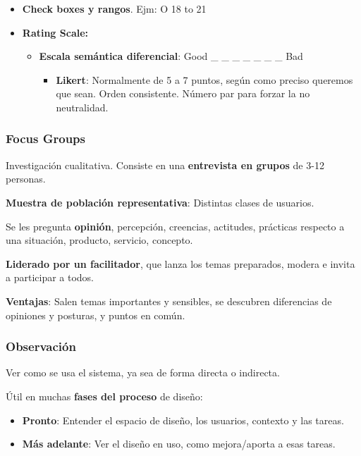 \documentclass[12pt]{report} %
\begin{document}
\begin{itemize}
\item
  \textbf{Check boxes y rangos}. Ejm: O 18 to 21
\item
  \textbf{Rating Scale:}

  \begin{itemize}
  
  \item
    \textbf{Escala semántica diferencial}: Good \_ \_ \_ \_ \_ \_ \_ Bad

    \begin{itemize}
    
    \item
      \textbf{Likert}: Normalmente de 5 a 7 puntos, según como preciso
      queremos que sean. Orden consistente. Número par para forzar la no
      neutralidad.
    \end{itemize}
  \end{itemize}
\end{itemize}

\hypertarget{focus-groups}{%
\subsubsection{Focus Groups}\label{focus-groups}}

Investigación cualitativa. Consiste en una \textbf{entrevista en grupos}
de 3-12 personas.

\textbf{Muestra de población representativa}: Distintas clases de
usuarios.

Se les pregunta \textbf{opinión}, percepción, creencias, actitudes,
prácticas respecto a una situación, producto, servicio, concepto.

\textbf{Liderado por un facilitador}, que lanza los temas preparados,
modera e invita a participar a todos.

\textbf{Ventajas}: Salen temas importantes y sensibles, se descubren
diferencias de opiniones y posturas, y puntos en común.

\hypertarget{observaciuxf3n}{%
\subsubsection{Observación}\label{observaciuxf3n}}

Ver como se usa el sistema, ya sea de forma directa o indirecta.

Útil en muchas \textbf{fases del proceso} de diseño:

\begin{itemize}

\item
  \textbf{Pronto}: Entender el espacio de diseño, los usuarios, contexto
  y las tareas.
\item
  \textbf{Más adelante}: Ver el diseño en uso, como mejora/aporta a esas
  tareas.
\end{itemize}
\end{document}
